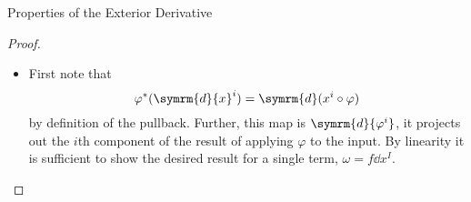 \documentclass[fleqn]{NotesClass}
\renewcommand{\dl}{\symrm{d}}
\begin{document}
\begin{lma}{Properties of the Exterior Derivative}{}
\begin{proof}
\begin{itemize}
                Now, suppose that \(\dl^2\) vanishes for all \(k - 1\) forms, and consider a \(k\)-form \(\omega\).
                By linearity it is again sufficient to prove this for a single term, so we may take
                \begin{equation}
                    \omega = f \dl{x^I},
                \end{equation}
                for some smooth function, \(f\), and some fixed \(I \in \symcal{I}_{k,m}\).
                We then have
                \begin{equation}
                    \dl{\omega} = \dl{f} \wedge \dl{x^I} = \sum_{i=1}^m \diffp{f}{x^i} \dd{x^i}.
                \end{equation}
                Computing the second exterior derivative and using the graded Leibniz rule, and the fact that \(f\) is a zero form and \(\dl{f}\) is a \(1\)-form, we have
                \begin{align}
                    \dl^2\omega &= \dl{(\dl{f} \wedge \dl{x^I})}\\
                    &= \dl^2 f \wedge \dl{x^I} - \dl{f} \wedge \dl^2{x^I}.
                \end{align}
                The first term vanishes because \(f\) is a 0-form, so this is the base case.
                The second term vanishes because we can use the graded Leibniz rule to write
                \begin{align}
                    \dl{^2x^I} &= \dl{(\dl{x^{i_1}} \wedge \dotsb \wedge \dl{x^{i_k}})}\\
                    &= \dl^2 x^{i_1} \wedge \dl{x^{i_2}} \wedge \dotsb \wedge \dl{x^{i_k}} - \dl{x^{i_1}} \wedge \dl^2{x^{i_2}} \wedge \dotsb \wedge \dl{x^{i_k}} \notag\\
                    &+ \dotsb + (-1)^{k-1} \dl{x^{i_1}} \wedge \dl{x^{i_2}} \wedge \dotsb \wedge \dl^2{x^{i_k}}
                \end{align}
                and each \(\dl^2{x^i}\) vanishes as \(x^i\) is a 0-form.
                \item First note that
                \begin{equation}
                    \varphi^*(\dl{x}^i) = \dl (x^i \circ \varphi)
                \end{equation}
                by definition of the pullback.
                Further, this map is \(\dl{\varphi^i}\), it projects out the \(i\)th component of the result of applying \(\varphi\) to the input.
                By linearity it is sufficient to show the desired result for a single term, \(\omega = f \dd{x^I}\).

\end{itemize}
\end{proof}
\end{lma}
\end{document}
